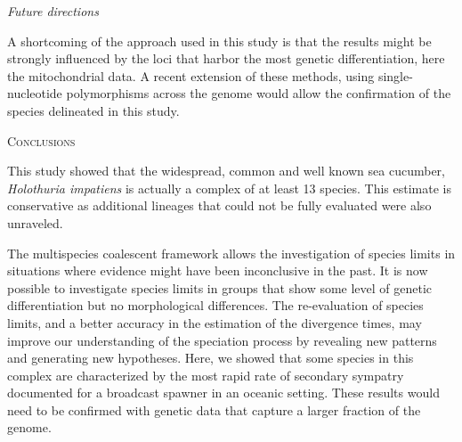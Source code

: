 \documentclass[12pt,letterpaper]{article}\usepackage[]{graphicx}\usepackage[]{color}
\renewcommand{\section}[1]{%
\bigskip
\begin{center}
\begin{Large}
\normalfont\scshape #1
\medskip
\end{Large}
\end{center}}
\renewcommand{\subsection}[1]{%
\bigskip
\begin{center}
\begin{large}
\normalfont\itshape #1
\end{large}
\end{center}}
\begin{document}
\subsection{Future directions}

A shortcoming of the approach used in this study is that the results might be
strongly influenced by the loci that harbor the most genetic differentiation,
here the mitochondrial data. A recent extension of these methods, using
single-nucleotide polymorphisms across the genome \citep{Leache2014} would allow
the confirmation of the species delineated in this study.

\section{Conclusions}

This study showed that the widespread, common and well known sea cucumber,
\textit{Holothuria impatiens} is actually a complex of at least 13
species. This estimate is conservative as additional lineages that could not be
fully evaluated were also unraveled.

The multispecies coalescent framework allows the investigation of species limits
in situations where evidence might have been inconclusive in the past. It is now
possible to investigate species limits in groups that show some level of genetic
differentiation but no morphological differences. The re-evaluation of species
limits, and a better accuracy in the estimation of the divergence times, may
improve our understanding of the speciation process by revealing new patterns
and generating new hypotheses. Here, we showed that some species in this complex
are characterized by the most rapid rate of secondary sympatry documented for a
broadcast spawner in an oceanic setting. These results would need to be
confirmed with genetic data that capture a larger fraction of the genome.





\end{document}
